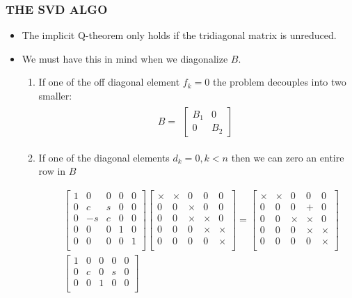 \documentclass[a4paper,8pt]{beamer} %
\newcommand{\smatrix}[1]{\left[\begin{matrix} #1 \end{matrix}\right]}
\begin{document}
\begin{frame}%
\frametitle{THE SVD ALGO}
\begin{itemize}
	\item The implicit Q-theorem only holds if the tridiagonal matrix is unreduced. 
	\item We must have this in mind when we diagonalize $B$. 
		\begin{enumerate}
			\item
				If one of the off diagonal element $f_k=0$ the problem decouples into two smaller:
				\begin{align}
					B = 
					\begin{matrix}
						\smatrix{B_1 & 0 \\ 0 & B_2}
					\end{matrix}
				\end{align}
			\item If one of the diagonal elements $d_k=0, k<n$ then we can zero an entire row in $B$
				\begin{footnotesize}
				\begin{align}
						&\smatrix
						{
							1 	& 0 & 0 & 0 & 0   \\
							0 	& c & s & 0 & 0   \\
							0 	& -s & c & 0 & 0    \\
							0 & 0 & 0 & 1 & 0   \\
							0 & 0 & 0 & 0 & 1  \\
						}
						\smatrix
						{
							\times 	& \times & 0 & 0 & 0   \\
							0 	& 0 & \times & 0 & 0   \\
							0 	& 0 & \times & \times & 0    \\
							0 & 0 & 0 & \times & \times   \\
							0 & 0 & 0 & 0 & \times  \\
						}
						=
						\smatrix
						{
							\times 	& \times & 0 & 0 & 0   \\
							0 	& 0 & 0 & + & 0   \\
							0 	& 0 & \times & \times & 0    \\
							0 & 0 & 0 & \times & \times   \\
							0 & 0 & 0 & 0 & \times  \\
						}\\
						&\smatrix
						{
							1 & 0 & 0 & 0 & 0   \\
							0 & c & 0 & s & 0   \\
							0 & 0 & 1 & 0 & 0    \\
}
\end{align}
\end{footnotesize}
\end{enumerate}
\end{itemize}
\end{frame}
\end{document}
